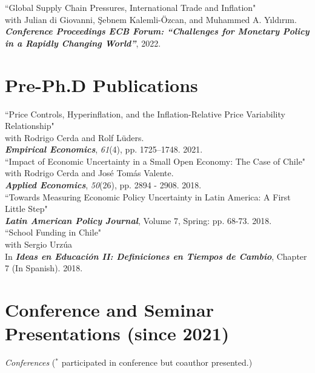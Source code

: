 \documentclass[11pt]{article}
\begin{document}
``Global Supply Chain Pressures, International Trade and Inflation"\\
with Julian di Giovanni, \c{S}ebnem Kalemli-\"{O}zcan, and Muhammed A. Y{\i}ld{\i}r{\i}m. \\
\textbf{\textit{Conference Proceedings ECB Forum: ``Challenges for Monetary Policy in a Rapidly Changing World''}}, 2022.\\[-0.1in]

\section*{Pre-Ph.D Publications}
``Price Controls, Hyperinflation, and the Inflation-Relative Price Variability Relationship"\\
 with Rodrigo Cerda and Rolf L\"{u}ders. \\
 \textbf{\textit{Empirical Economics}}, \emph{61}(4), pp. 1725--1748. 2021.\\[-0.1in]

``Impact of Economic Uncertainty in a Small Open Economy: The Case of Chile"\\
 with Rodrigo Cerda and Jos\'e Tom\'as Valente. \\
 \textbf{\textit{Applied Economics}}, \textit{50}(26), pp. 2894 - 2908. 2018.\\[-0.1in]



``Towards Measuring Economic Policy Uncertainty in Latin America: A First Little Step" \\
\textbf{\textit{Latin American Policy Journal}}, Volume 7, Spring: pp. 68-73. 2018.\\[-0.1in]

``School Funding in Chile"\\
 with Sergio Urz\'ua \\
In  \textbf{\textit{Ideas en Educaci\'on II: Definiciones en Tiempos de Cambio}}, Chapter 7 (In Spanish). 2018.

\section*{Conference and Seminar Presentations (since 2021)}

\emph{Conferences} ({\footnotesize $^\ast$ participated in conference but coauthor presented.})
\end{document}
